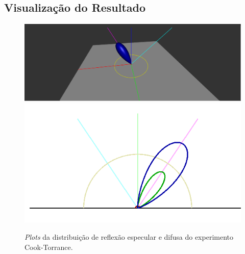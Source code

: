 \subsection{Visualização do Resultado}
\begin{figure}[H]
    \caption{\small{\textit{Plots} da distribuição de reflexão especular e difusa do experimento Cook-Torrance.}}
    \label{fig-cook-torrance-plots}
    \vspace{42px}
  \includegraphics[width=\linewidth]{./Imagens/brdfs/cook-torrance-3D-plot}
\endminipage\hfill
{}
  \includegraphics[width=\linewidth]{./Imagens/brdfs/cook-torrance-polar-plot-log.png}
\endminipage\hfill
\end{figure}

